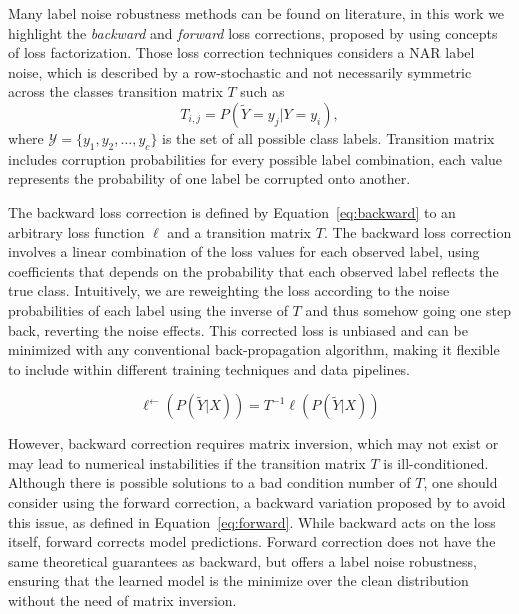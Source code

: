 Many label noise robustness methods can be found on literature, in this work we highlight the \textit{backward} and \textit{forward} loss corrections, proposed by \cite{Patrini2017} using concepts of loss factorization. Those loss correction techniques considers a NAR label noise, which is described by a row-stochastic and not necessarily symmetric across the classes transition matrix $T$ such as
\begin{equation}
    T_{i,j} = P(\tilde{Y} = y_j|Y = y_i),
\end{equation}
where $\mathcal{Y} = \{y_1, y_2, \ldots, y_c\}$ is the set of all possible class labels. Transition matrix includes corruption probabilities for every possible label combination, each value represents the probability of one label be corrupted onto another. 

The backward loss correction is defined by Equation~\ref{eq:backward} to an arbitrary loss function $\ell$ and a transition matrix $T$. The backward loss correction involves a linear combination of the loss values for each observed label, using coefficients that depends on the probability that each observed label reflects the true class. Intuitively, we are reweighting the loss according to the noise probabilities of each label using the inverse of $T$ and thus somehow going one step back, reverting the noise effects. This corrected loss is unbiased and can be minimized with any conventional back-propagation algorithm, making it flexible to include within different training techniques and data pipelines.


\begin{equation} \label{eq:backward}
    \ell^{\leftarrow}(P(\tilde{Y}|X)) = T^{-1} \ell(P(\tilde{Y}|X))
\end{equation}

However, backward correction requires matrix inversion, which may not exist or may lead to numerical instabilities if the transition matrix $T$ is ill-conditioned. Although there is possible solutions to a bad condition number of $T$, one should consider using the forward correction, a backward variation proposed by \cite{Patrini2017} to avoid this issue, as defined in Equation~\ref{eq:forward}. While backward acts on the loss itself, forward corrects model predictions. Forward correction does not have the same theoretical guarantees as backward, but offers a label noise robustness, ensuring that the learned model is the minimize over the clean distribution without the need of matrix inversion.

